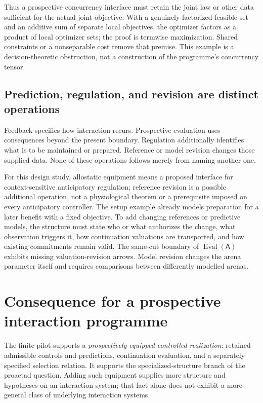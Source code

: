 \documentclass[11pt]{article}
\theoremstyle{definition}
\newcommand{\A}{\mathsf A}
\newcommand{\Eval}{\operatorname{Eval}}
\begin{document}
Thus a prospective concurrency interface must retain the joint law or
other data sufficient for the actual joint objective. With a genuinely
factorized feasible set and an additive sum of separate local objectives,
the optimizer factors as a product of local optimizer sets; the proof is
termwise maximization. Shared constraints or a nonseparable cost remove
that premise. This example is a decision-theoretic obstruction, not a
construction of the programme's concurrency tensor.

\subsection{Prediction, regulation, and revision are distinct operations}
Feedback specifies how interaction recurs. Prospective evaluation uses
consequences beyond the present boundary. Regulation additionally identifies
what is to be maintained or prepared. Reference or model revision changes
those supplied data. None of these operations follows merely from naming
another one.

For this design study, allostatic equipment means a proposed interface for
context-sensitive anticipatory regulation; reference revision is a possible
additional operation, not a physiological theorem or a prerequisite imposed
on every anticipatory controller. The setup example already models
preparation for a later benefit with a fixed objective. To add changing
references or predictive models, the structure must state who or what
authorizes the change, what observation triggers it, how continuation
valuations are transported, and how existing commitments remain valid.
The same-cut boundary of \(\Eval(\A)\) exhibits missing valuation-revision
arrows. Model revision changes the arena parameter itself and requires
comparisons between differently modelled arenas.

\section{Consequence for a prospective interaction programme}
\label{sec:consequence}
The finite pilot supports a \emph{prospectively equipped controlled
realization}: retained admissible controls and predictions, continuation
evaluation, and a separately specified selection relation. It supports
the specialized-structure branch of the proactad question. Adding such
equipment supplies more structure and hypotheses on an interaction system;
that fact alone does not exhibit a more general class of underlying
interaction systems.
\end{document}
